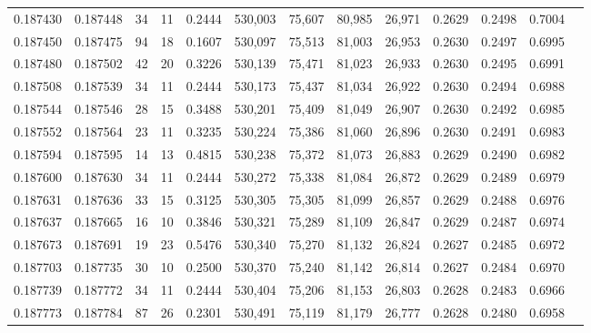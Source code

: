 \begin{tabular}{rrrrrrrrrrrrr}
0.187430 & 0.187448 &    34 &  11 &                                     0.2444 & 530,003 &  75,607 &  80,985 &  26,971 & 0.2629 & 0.2498 & 0.7004 \\
0.187450 & 0.187475 &    94 &  18 &                                     0.1607 & 530,097 &  75,513 &  81,003 &  26,953 & 0.2630 & 0.2497 & 0.6995 \\
0.187480 & 0.187502 &    42 &  20 &                                     0.3226 & 530,139 &  75,471 &  81,023 &  26,933 & 0.2630 & 0.2495 & 0.6991 \\
0.187508 & 0.187539 &    34 &  11 &                                     0.2444 & 530,173 &  75,437 &  81,034 &  26,922 & 0.2630 & 0.2494 & 0.6988 \\
0.187544 & 0.187546 &    28 &  15 &                                     0.3488 & 530,201 &  75,409 &  81,049 &  26,907 & 0.2630 & 0.2492 & 0.6985 \\
0.187552 & 0.187564 &    23 &  11 &                                     0.3235 & 530,224 &  75,386 &  81,060 &  26,896 & 0.2630 & 0.2491 & 0.6983 \\
0.187594 & 0.187595 &    14 &  13 &                                     0.4815 & 530,238 &  75,372 &  81,073 &  26,883 & 0.2629 & 0.2490 & 0.6982 \\
0.187600 & 0.187630 &    34 &  11 &                                     0.2444 & 530,272 &  75,338 &  81,084 &  26,872 & 0.2629 & 0.2489 & 0.6979 \\
0.187631 & 0.187636 &    33 &  15 &                                     0.3125 & 530,305 &  75,305 &  81,099 &  26,857 & 0.2629 & 0.2488 & 0.6976 \\
0.187637 & 0.187665 &    16 &  10 &                                     0.3846 & 530,321 &  75,289 &  81,109 &  26,847 & 0.2629 & 0.2487 & 0.6974 \\
0.187673 & 0.187691 &    19 &  23 &                                     0.5476 & 530,340 &  75,270 &  81,132 &  26,824 & 0.2627 & 0.2485 & 0.6972 \\
0.187703 & 0.187735 &    30 &  10 &                                     0.2500 & 530,370 &  75,240 &  81,142 &  26,814 & 0.2627 & 0.2484 & 0.6970 \\
0.187739 & 0.187772 &    34 &  11 &                                     0.2444 & 530,404 &  75,206 &  81,153 &  26,803 & 0.2628 & 0.2483 & 0.6966 \\
0.187773 & 0.187784 &    87 &  26 &                                     0.2301 & 530,491 &  75,119 &  81,179 &  26,777 & 0.2628 & 0.2480 & 0.6958 \\

\end{tabular}
